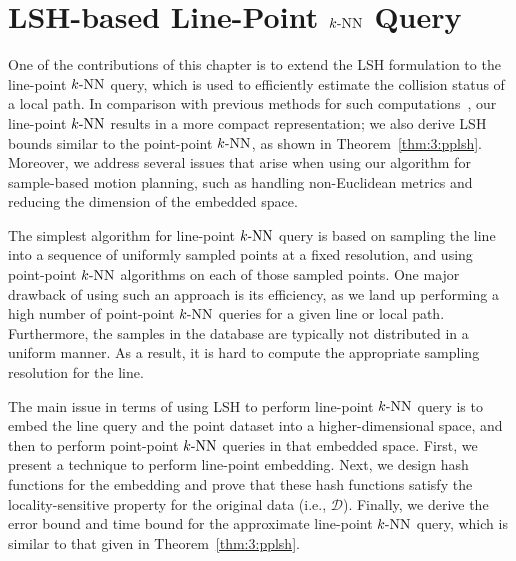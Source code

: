 \section{LSH-based Line-Point $k\text{-NN}$ Query}
\label{sec:3:linelsh}
One of the contributions of this chapter is to extend the LSH formulation to the line-point $k\text{-NN}$ query, which is used to efficiently estimate the collision status of a local path. In comparison with previous methods for such computations~\cite{Andoni:2009:ALN,Basri:2011}, our line-point $k\text{-NN}$ results in a more compact representation; we also derive LSH bounds similar to the point-point $k\text{-NN}$, as shown in Theorem~\ref{thm:3:pplsh}. Moreover, we address several issues that arise when using our algorithm for sample-based motion planning, such as handling non-Euclidean metrics and reducing the dimension of the embedded space.

The simplest algorithm for line-point $k\text{-NN}$ query is based on sampling the line into a sequence of uniformly sampled points at a fixed resolution, and using point-point $k\text{-NN}$ algorithms on each of those sampled points. One major drawback of using such an approach is its efficiency, as we land up performing a high number of point-point $k\text{-NN}$ queries for a given line or local path. Furthermore, the samples in the database are typically not distributed in a uniform manner. As a result, it is hard to compute the appropriate sampling resolution for the line.

The main issue in terms of using LSH to perform line-point $k\text{-NN}$ query is to embed the line query and the point dataset into a higher-dimensional space, and then to perform point-point $k\text{-NN}$ queries in that embedded space. First, we present a technique to perform line-point embedding. Next, we design hash functions for the embedding and prove that these hash functions satisfy the locality-sensitive property for the original data (i.e., $\mathcal D$). Finally, we derive the error bound and time bound for the approximate line-point $k\text{-NN}$ query, which is similar to that given in Theorem~\ref{thm:3:pplsh}.


